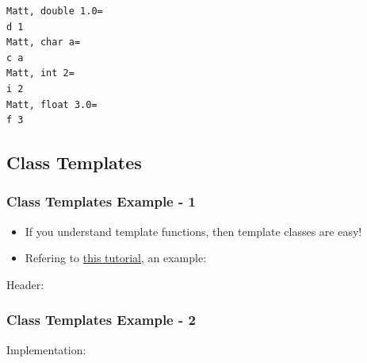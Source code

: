 \begin{verbatim}
Matt, double 1.0=
d 1
Matt, char a=
c a
Matt, int 2=
i 2
Matt, float 3.0=
f 3
\end{verbatim}

\subsection{Class Templates}\label{class-templates}

\subsubsection{Class Templates Example -
1}\label{class-templates-example---1}

\begin{itemize}
\itemsep1pt\parskip0pt
\item
  If you understand template functions, then template classes are easy!
\item
  Refering to
  \href{http://www.cplusplus.com/doc/tutorial/templates/}{this
  tutorial}, an example:
\end{itemize}

Header:

\begin{Shaded}
\begin{Highlighting}[]
 \NormalTok{<} 
 
    \NormalTok{T m_Values [}\NormalTok{];}
  \NormalTok{:}
      
    \NormalTok{;}
\NormalTok{\};}
\end{Highlighting}
\end{Shaded}

\subsubsection{Class Templates Example -
2}\label{class-templates-example---2}

Implementation:

\begin{Shaded}
\begin{Highlighting}[]
 \NormalTok{<} 
  
\NormalTok{\{}
  \NormalTok{m_Values[}\NormalTok{] = first;}
  \NormalTok{m_Values[}\NormalTok{] = second;}
\NormalTok{\}}

 \NormalTok{<} 
\NormalTok{\{}
   \NormalTok{(m_Values[}\NormalTok{] > m_Values[}\NormalTok{])}
     \NormalTok{m_Values[}\NormalTok{];}
     \NormalTok{m_Values[}\NormalTok{];}
\NormalTok{\}}
\end{Highlighting}
\end{Shaded}

